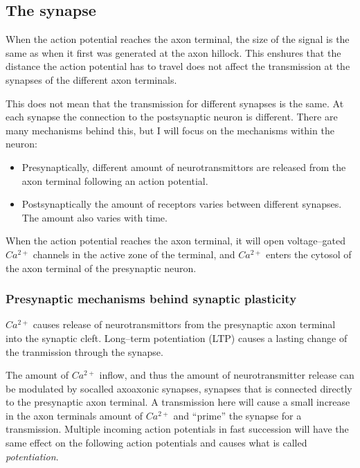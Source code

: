 




\subsection{The synapse}
When the action potential reaches the axon terminal, the size of the signal is the same as when it first was generated at the axon hillock.
This enshures that the distance the action potential has to travel does not affect the transmission at the synapses of the different axon terminals. \cite{?}

This does not mean that the transmission for different synapses is the same. At each synapse the connection to the postsynaptic neuron is different. 
There are many mechanisms behind this, but I will focus on the mechanisms within the neuron:
\begin{itemize}
	\item Presynaptically, different amount of neurotransmittors are released from the axon terminal following an action potential.
	\item Postsynaptically the amount of receptors varies between different synapses. The amount also varies with time.%
\end{itemize}

When the action potential reaches the axon terminal, it will open voltage--gated $Ca^{2+}$ channels in the active zone of the terminal, and $Ca^{2+}$ enters the cytosol of the axon terminal of the presynaptic neuron\cite{PrinciplesOfNeuralScience4edKAP10}.


\subsubsection{Presynaptic mechanisms behind synaptic plasticity}
$Ca^{2+}$ causes release of neurotransmittors from the presynaptic axon terminal into the synaptic cleft\cite{PrinciplesOfNeuralScience4edKAP10}. 
Long--term potentiation (LTP) causes a lasting change of the tranmission through the synapse.%

The amount of $Ca^{2+}$ inflow, and thus the amount of neurotransmitter release can be modulated by socalled axoaxonic synapses\cite{NeuroscienceExploringTheBrain3edKAP5}, synapses that is connected directly to the presynaptic axon terminal. 
A transmission here will cause a small increase in the axon terminals amount of $Ca^{2+}$ and ``prime'' the synapse for a transmission. 
Multiple incoming action potentials in fast succession will have the same effect on the following action potentials and causes what is called \emph{potentiation}\cite{PrinciplesOfNeuralScience4edKAP14}. 

